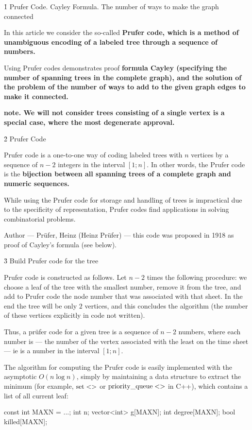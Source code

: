 \h1{ Prufer Code. Cayley Formula. The number of ways to make the graph connected }

In this article we consider the so-called \bf{Prufer code}, which is a method of unambiguous encoding of a labeled tree through a sequence of numbers.

Using Prufer codes demonstrates proof \bf{formula Cayley} (specifying the number of spanning trees in the complete graph), and the solution of the problem of the number of ways to add to the given graph edges to make it connected.

\bf{note}. We will not consider trees consisting of a single vertex is a special case, where the most degenerate approval.



\h2{ Prufer Code }

Prufer code is a one-to-one way of coding labeled trees with $n$ vertices by a sequence of $n-2$ integers in the interval $[1;n]$. In other words, the Prufer code is the \bf{bijection} between all spanning trees of a complete graph and numeric sequences.

While using the Prufer code for storage and handling of trees is impractical due to the specificity of representation, Prufer codes find applications in solving combinatorial problems.

Author --- Prüfer, Heinz (Heinz Prüfer) --- this code was proposed in 1918 as proof of Cayley's formula (see below).


\h3{ Build Prufer code for the tree }

Prufer code is constructed as follows. Let $n-2$ times the following procedure: we choose a leaf of the tree with the smallest number, remove it from the tree, and add to Prufer code the node number that was associated with that sheet. In the end the tree will be only $2$ vertices, and this concludes the algorithm (the number of these vertices explicitly in code not written).

Thus, a prüfer code for a given tree is a sequence of $n-2$ numbers, where each number is --- the number of the vertex associated with the least on the time sheet --- ie is a number in the interval $[1;n]$.

The algorithm for computing the Prufer code is easily implemented with the asymptotic $O (n \log n)$, simply by maintaining a data structure to extract the minimum (for example, $\rm set<>$ or $\rm priority\_queue<>$ in C++), which contains a list of all current leaf:

\code
const int MAXN = ...;
int n;
vector<int> g[MAXN];
int degree[MAXN];
bool killed[MAXN];

